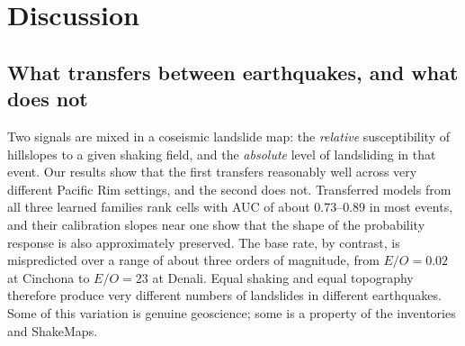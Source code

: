 \section{Discussion}\label{sec:disc}

\subsection{What transfers between earthquakes, and what does not}\label{sec:disc_transfer}
Two signals are mixed in a coseismic landslide map: the \emph{relative} susceptibility of hillslopes to a given shaking field, and the \emph{absolute} level of landsliding in that event. Our results show that the first transfers reasonably well across very different Pacific Rim settings, and the second does not. Transferred models from all three learned families rank cells with AUC of about 0.73--0.89 in most events, and their calibration slopes near one show that the shape of the probability response is also approximately preserved. The base rate, by contrast, is mispredicted over a range of about three orders of magnitude, from $E/O=0.02$ at Cinchona to $E/O=23$ at Denali. Equal shaking and equal topography therefore produce very different numbers of landslides in different earthquakes. Some of this variation is genuine geoscience; some is a property of the inventories and ShakeMaps.

